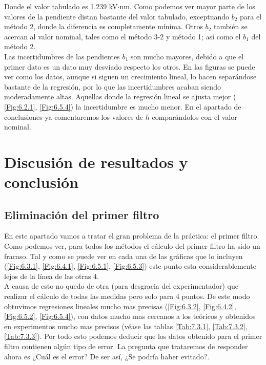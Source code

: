 \documentclass[12pt,a4paper]{article}
\numberwithin{equation}{section}
\numberwithin{table}{section}
\numberwithin{figure}{section}
\begin{document}
Donde el valor tabulado es 1.239 kV$\cdot$nm. Como podemos ver mayor parte de los valores de la pendiente distan bastante del valor tabulado, exceptuando $b_2$ para el método 2, donde la diferencia es completamente mínima. Otros $b_2$ también se acercan al valor nominal, tales como el método 3-2 y método 1; así como el $b_1$ del método 2. \\

Las incertidumbres de las pendientes $b_1$ son mucho mayores, debido a que el primer dato es un dato muy desviado respecto los otros. En las figuras se puede ver como los datos, aunque si siguen un crecimiento lineal, lo hacen separándose bastante de la regresión, por lo que las incertidumbres acaban siendo moderadamente altas. Aquellas donde la regresión lineal se ajusta mejor ( \ref{Fig:6.2.1}, \ref{Fig:6.5.4}) la incertidumbre es mucho menor. En el apartado de conclusiones ya comentaremos los valores de $h$ comparándolos con el valor nominal. 

\section{Discusión de resultados y conclusión}

\subsection{Eliminación del primer filtro}

En este apartado vamos a tratar el gran problema de la práctica: el primer filtro. Como podemos ver, para todos los métodos el cálculo del primer filtro ha sido un fracaso. Tal y como se puede ver en cada una de las gráficas que lo incluyen (\ref{Fig:6.3.1}, \ref{Fig:6.4.1}, \ref{Fig:6.5.1}, \ref{Fig:6.5.3}) este punto esta considerablemente lejos de la línea de las otras 4.  \\

A causa de esto no quedo de otra (para desgracia del experimentador) que realizar el cálculo de todas las medidas pero solo para 4 puntos. De este modo obtuvimos regresiones lineales mucho mas precisas (\ref{Fig:6.3.2}, \ref{Fig:6.4.2}, \ref{Fig:6.5.2}, \ref{Fig:6.5.4}), con datos mucho mas cercanos a los teóricos y obtenidos en experimentos mucho mas precisos (véase las tablas \ref{Tab:7.3.1}, \ref{Tab:7.3.2}, \ref{Tab:7.3.3}). Por todo esto podemos deducir que los datos obtenido para el primer filtro contienen algún tipo de error. La pregunta que trataremos de responder ahora es ¿Cuál es el error? De ser así, ¿Se podría haber evitado?. \\
\end{document}
